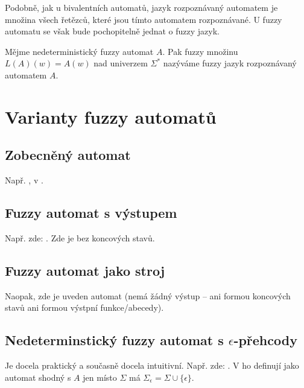 \documentclass[a4paper,10pt]{article}
\begin{document}
Podobně, jak u bivalentních automatů, jazyk rozpoznávaný automatem je množina všech řetězců, které jsou tímto automatem rozpoznávané. U fuzzy automatu se však bude pochopitelně jednat o fuzzy jazyk.

\begin{definition}\label{def-JazRozpAut}
 Mějme nedeterministický fuzzy automat $A$. Pak fuzzy množinu $L(A)(w) = A(w)$ nad univerzem $\Sigma^*$ nazýváme fuzzy jazyk rozpoznávaný automatem $A$.
\end{definition}



\section{Varianty fuzzy automatů}

\subsection{Zobecněný automat}
Např. \cite{DooKre-NewDirFuzzAut}, v \cite{San-MaxAut}.

\subsection{Fuzzy automat s výstupem}
Např. zde: \cite{BlaDelPeg-FuzzAutIndUsNeuNet}. Zde \cite{PedGac-LeaFuzzAut}\cite{BlaDelPeg-FuzzGraIntUsiNeuNet}\cite{CheMo-MinAlgFuzFinAut}\cite{ThoMar-DetAccRegFuzLang}  je bez koncových  stavů.

\subsection{Fuzzy automat jako stroj}
Naopak, zde \cite{Qiu-ChaFuzFinAut} je uveden automat  (nemá žádný výstup -- ani formou koncových stavů ani formou výstpní funkce/abecedy).

\subsection{Nedeterminstický fuzzy automat s $\epsilon$-přehcody}
Je docela praktický a současně docela intuitivní. Např. zde: \cite{SnaKepAbrHas-AproxStriMatchFuzzAut}. V \cite{LiLiLi-RelAmoSevTypFuzAut} ho definují jako automat shodný s $A$ jen místo $\Sigma$ má $\Sigma_\epsilon = \Sigma \cup \{ \epsilon \}$.
\end{document}
